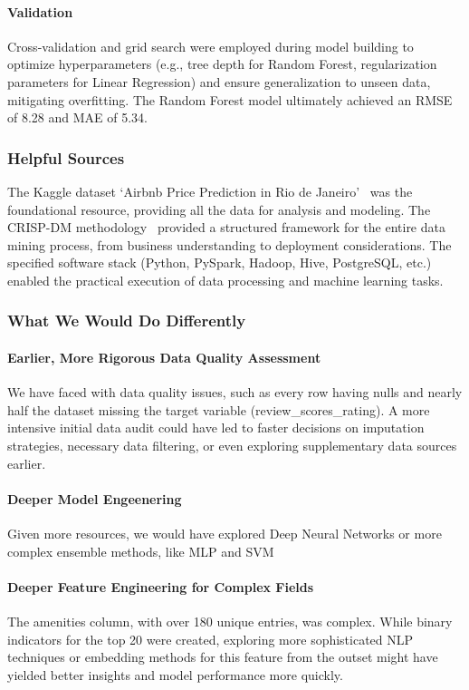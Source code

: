 \paragraph{Validation}
Cross-validation and grid search were employed during model building to optimize hyperparameters (e.g., tree depth for Random Forest, regularization parameters for Linear Regression) and ensure generalization to unseen data, mitigating overfitting. The Random Forest model ultimately achieved an RMSE of 8.28 and MAE of 5.34.

\subsubsection*{Helpful Sources}
The Kaggle dataset `Airbnb Price Prediction in Rio de Janeiro'~\cite{airbnb_rio_kaggle} was the foundational resource, providing all the data for analysis and modeling. The CRISP-DM methodology~\cite{crispdm2000} provided a structured framework for the entire data mining process, from business understanding to deployment considerations. The specified software stack (Python, PySpark, Hadoop, Hive, PostgreSQL, etc.) enabled the practical execution of data processing and machine learning tasks.

\subsubsection*{What We Would Do Differently }

\paragraph{Earlier, More Rigorous Data Quality Assessment}
We have faced with data quality issues, such as every row having nulls and nearly half the dataset missing the target variable (review\_scores\_rating). A more intensive initial data audit could have led to faster decisions on imputation strategies, necessary data filtering, or even exploring supplementary data sources earlier.

\paragraph{Deeper Model Engeenering}
Given more resources, we would have explored Deep Neural Networks or more complex ensemble methods, like MLP and SVM

\paragraph{Deeper Feature Engineering for Complex Fields}
The amenities column, with over 180 unique entries, was complex. While binary indicators for the top 20 were created, exploring more sophisticated NLP techniques or embedding methods for this feature from the outset might have yielded better insights and model performance more quickly.

